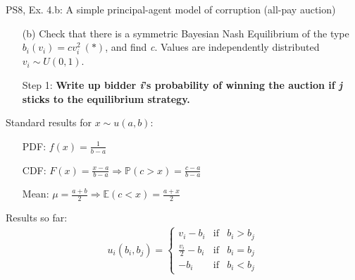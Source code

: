 \begin{frame}{PS8, Ex. 4.b: A simple principal-agent model of corruption (all-pay auction)}
    \begin{itemize}
      \item[(b)] Check that there is a symmetric Bayesian Nash Equilibrium of the type $b_i(v_i) = cv_i^2\ (*)$, and find \textit{c}. Values are independently distributed $v_i\sim U(0, 1)$.
    \end{itemize} \vspace{-8pt}
    \begin{multicols}{2}
      \begin{itemize}
        \item[Step 1:] \textbf{Write up bidder \textit{i}'s probability of winning the auction if \textit{j} sticks to the equilibrium strategy.}
      \end{itemize}
      \vfill\null\columnbreak
      Standard results for $x\sim u(a, b):$ \vspace{-6pt}
      \begin{itemize}
        \item[PDF:] $f(x)=\frac{1}{b-a}$
        \item[CDF:] $F(x)=\frac{x-a}{b-a}\Rightarrow\mathbb{P}(c>x)=\frac{c-a}{b-a}$
        \item[Mean:] $\mu=\frac{a+b}{2}\Rightarrow\mathbb{E}(c<x)=\frac{a+x}{2}$
      \end{itemize}
      \vspace{-6pt}
      Results so far: \vspace{-6pt}
      \begin{align*}
        u_i(b_i,b_j)=\left\{\begin{array}{lcl}
          v_i-b_i           & \text{if} & b_i>b_j \\
          \frac{v_i}{2}-b_i & \text{if} & b_i=b_j \\
          -b_i              & \text{if} & b_i<b_j
        \end{array}\right.
      \end{align*}
      \vfill\null
    \end{multicols}
\end{frame}
